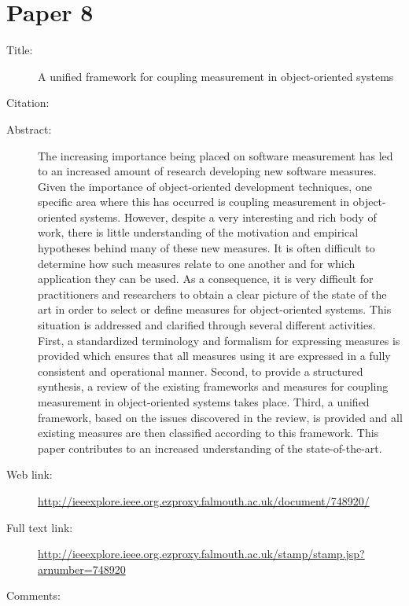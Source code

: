 \documentclass{scrartcl}
\begin{document}
\section*{Paper 8}
\begin{description}
\item[Title:]A unified framework for coupling measurement in object-oriented systems
\item[Citation:] \cite{briand1999unified}
\item[Abstract:] The increasing importance being placed on software measurement has led to an increased amount of research developing new software measures. Given the importance of object-oriented development techniques, one specific area where this has occurred is coupling measurement in object-oriented systems. However, despite a very interesting and rich body of work, there is little understanding of the motivation and empirical hypotheses behind many of these new measures. It is often difficult to determine how such measures relate to one another and for which application they can be used. As a consequence, it is very difficult for practitioners and researchers to obtain a clear picture of the state of the art in order to select or define measures for object-oriented systems. This situation is addressed and clarified through several different activities. First, a standardized terminology and formalism for expressing measures is provided which ensures that all measures using it are expressed in a fully consistent and operational manner. Second, to provide a structured synthesis, a review of the existing frameworks and measures for coupling measurement in object-oriented systems takes place. Third, a unified framework, based on the issues discovered in the review, is provided and all existing measures are then classified according to this framework. This paper contributes to an increased understanding of the state-of-the-art.
\item[Web link:]\url  {http://ieeexplore.ieee.org.ezproxy.falmouth.ac.uk/document/748920/}
\item[Full text link:] \url {http://ieeexplore.ieee.org.ezproxy.falmouth.ac.uk/stamp/stamp.jsp?arnumber=748920}
\item[Comments:]
\end{description}
\end{document}
